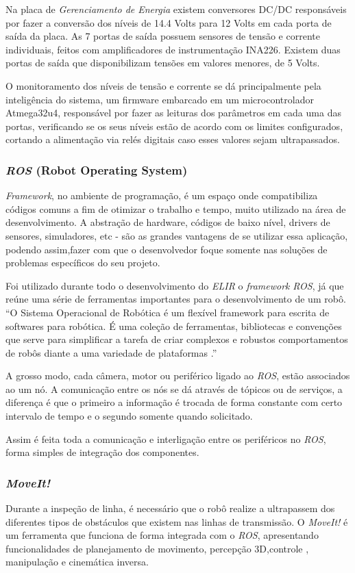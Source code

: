 Na placa de \textit{Gerenciamento de Energia} existem conversores DC/DC responsáveis por fazer a conversão dos níveis de 14.4 Volts para 12 Volts em cada porta de saída da placa. As 7 portas de saída  possuem sensores de tensão e corrente individuais, feitos com amplificadores de instrumentação INA226. Existem duas portas de saída que disponibilizam tensões em valores menores, de 5 Volts. 

O monitoramento dos níveis de tensão e corrente se dá principalmente pela inteligência do sistema, um firmware embarcado em um microcontrolador Atmega32u4, responsável por fazer as leituras dos parâmetros em cada uma das portas, verificando se os seus níveis estão de acordo com os limites configurados, cortando a alimentação via relés digitais caso esses valores sejam ultrapassados.

\subsubsection{\textit{ROS} (Robot Operating System)}
\textit{Framework}, no ambiente de programação, é um espaço onde compatibiliza códigos comuns a fim de otimizar o trabalho e tempo, muito utilizado na área de desenvolvimento. A abstração de hardware, códigos de baixo nível, drivers de sensores, simuladores, etc - são as grandes vantagens de se utilizar essa aplicação, podendo assim,fazer com que o desenvolvedor foque somente nas soluções de problemas específicos do seu projeto.

Foi utilizado durante todo o desenvolvimento do \textit{ELIR} o \textit{framework} \textit{ROS}, já que reúne uma série de ferramentas importantes para o desenvolvimento de um robô.  “O Sistema Operacional de Robótica é um flexível framework para escrita de softwares para robótica. É uma coleção de ferramentas, bibliotecas e convenções que serve para simplificar a tarefa de criar complexos e robustos comportamentos de robôs diante a uma variedade de plataformas \cite{ros_site}.”

A grosso modo, cada câmera, motor ou periférico ligado ao \textit{ROS}, estão associados ao um nó. A comunicação entre os nós se dá através de tópicos ou de serviços, a diferença é que o primeiro a informação é trocada de forma constante com certo intervalo de tempo e o segundo somente quando solicitado.

Assim é feita toda a comunicação e interligação entre os periféricos no \textit{ROS}, forma simples de integração dos componentes.

\subsubsection{\textit{MoveIt!}}
Durante a inspeção de linha, é necessário que o robô realize a ultrapassem dos diferentes tipos de obstáculos que existem nas linhas de transmissão. O \textit{MoveIt!} é um ferramenta que funciona de forma integrada com o \textit{ROS}, apresentando funcionalidades de planejamento de movimento, percepção 3D,controle , manipulação e cinemática inversa. 

